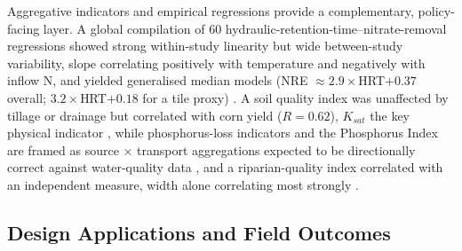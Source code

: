 \documentclass[11pt]{article}
\begin{document}
Aggregative indicators and empirical regressions provide a complementary, policy-facing layer. A global compilation of 60 hydraulic-retention-time--nitrate-removal regressions showed strong within-study linearity but wide between-study variability, slope correlating positively with temperature and negatively with inflow N, and yielded generalised median models (NRE $\approx2.9\times$HRT$+0.37$ overall; $3.2\times$HRT$+0.18$ for a tile proxy) \parencite{Christianson2025c}. A soil quality index was unaffected by tillage or drainage but correlated with corn yield ($R=0.62$), $K_{sat}$ the key physical indicator \parencite{Nakajima2015}, while phosphorus-loss indicators and the Phosphorus Index are framed as source $\times$ transport aggregations expected to be directionally correct against water-quality data \parencite{Reid2018,Zhang2018}, and a riparian-quality index correlated with an independent measure, width alone correlating most strongly \parencite{Terrado2015}.

\subsection{Design Applications and Field Outcomes}
\end{document}

